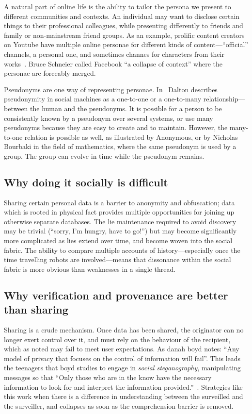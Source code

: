 \documentclass{IOS-Book-Article}     %
\begin{document}
A natural part of online life is the ability to tailor the persona we present to
different communities and contexts. An individual may want to disclose certain
things to their professional colleagues, while presenting differently to friends
and family or non-mainstream friend groups. 
As an example, prolific content creators on Youtube have multiple online
personae for different kinds of content---``official'' channels, a personal one,
and sometimes channes for characters from their works~\cite{guy2014ConstructedIdentity}.
Bruce Schneier called Facebook ``a collapse of context'' where the personae are
forceably merged.

Pseudonyms are one way of representing personae. In~\cite{dalton2013Pseudonymity} Dalton describes pseudonymity in social machines as
a one-to-one or a one-to-many relationship---between the human and the
pseudonyms. It is possible for a person to be consistently known by a pseudonym
over several systems, or use many pseudonyms because they are easy to create and
to maintain. However, the many-to-one relation is possible as well, as
illustrated by Anonymous, or by Nicholas Bourbaki in the field of mathematics,
where the same pseudonym is used by a group. The group can evolve in time while
the pseudonym remains. 

\subsection{Why doing it socially is difficult}

Sharing certain personal data is a barrier to anonymity and obfuscation; 
data which is rooted in physical fact provides multiple opportunities for
joining up otherwise separate databases. 
The lie maintenance required to avoid discovery may be trivial (``sorry, I'm hungry,
have to go!'') but may become significantly more complicated as lies extend over
time, and become woven into the social fabric. The ability to compare
multiple accounts of history---especially once the time travelling
robots are involved---means that dissonance within the social
fabric is more obvious than weaknesses in a single thread.




\subsection*{Why verification and provenance are better than sharing}

Sharing is a crude mechanism. Once data has been shared, the originator can no
longer exert control over it, and must rely on the behaviour of the recipient,
which as noted may fail to meet user expectations. As danah boyd
notes: ``Any model of privacy that focuses on the control of information will
fail''. This leads the teenagers that boyd studies to
engage in \emph{social steganography}, manipulating messages so that ``Only 
those who are in the know have the necessary information to look for and interpret the information 
provided.''~\cite{boyd2012Networked}. Strategies like this work when there is a
difference in understanding between the surveilled and the surveiller, and
collapses as soon as the comprehension barrier is removed.
\end{document}
